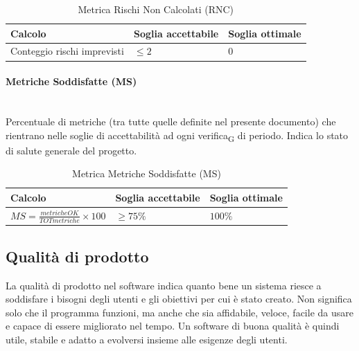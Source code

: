 \documentclass[11pt,a4paper]{article}
\newcommand{\gls}[1]{#1\textsubscript{G}}
\begin{document}
\begin{table}[H]
    \centering
    \renewcommand{\arraystretch}{1.5}
    \begin{tabular}{|M{0.4\textwidth}|M{0.25\textwidth}|M{0.25\textwidth}|}
        \hline
        \textbf{Calcolo} & \textbf{Soglia accettabile} & \textbf{Soglia ottimale} \\
        \hline
        Conteggio rischi imprevisti & $\le 2$ & $0$ \\
        \hline
    \end{tabular}
    \caption{Metrica Rischi Non Calcolati (RNC)}
\end{table}

\paragraph{Metriche Soddisfatte (MS)} \hfill \\
Percentuale di metriche (tra tutte quelle definite nel presente documento) che rientrano nelle soglie di accettabilità ad ogni \gls{verifica} di periodo. Indica lo stato di salute generale del progetto.

\begin{table}[H]
    \centering
    \renewcommand{\arraystretch}{1.5}
    \begin{tabular}{|M{0.4\textwidth}|M{0.25\textwidth}|M{0.25\textwidth}|}
        \hline
        \textbf{Calcolo} & \textbf{Soglia accettabile} & \textbf{Soglia ottimale} \\
        \hline
        $MS = \frac{metricheOK}{TOTmetriche} \times 100$ & $\ge 75\%$ & $100\%$ \\
        \hline
    \end{tabular}
    \caption{Metrica Metriche Soddisfatte (MS)}
\end{table}


\newpage
\subsection{Qualità di prodotto}
La qualità di prodotto nel software indica quanto bene un sistema riesce a soddisfare i bisogni degli utenti e gli obiettivi per cui è stato creato. Non significa solo che il programma funzioni, ma anche che sia affidabile, veloce, facile da usare e capace di essere migliorato nel tempo. Un software di buona qualità è quindi utile, stabile e adatto a evolversi insieme alle esigenze degli utenti.
\end{document}
